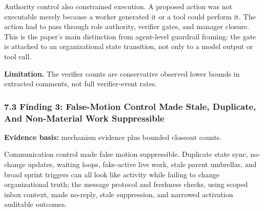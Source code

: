 \documentclass[
]{article}
\begin{document}
Authority control also constrained execution. A proposed action was not executable merely because a worker generated it or a tool could perform it. The action had to pass through role authority, verifier gates, and manager closure. This is the paper's main distinction from agent-level guardrail framing: the gate is attached to an organizational state transition, not only to a model output or tool call.

\textbf{Limitation.} The verifier counts are conservative observed lower bounds in extracted comments, not full verifier-event rates.

\subsubsection{7.3 Finding 3: False-Motion Control Made Stale, Duplicate, And Non-Material Work Suppressible}\label{finding-3-false-motion-control-made-stale-duplicate-and-non-material-work-suppressible}

\textbf{Evidence basis:} mechanism evidence plus bounded closeout counts.

Communication control made false motion suppressible. Duplicate state sync, no-change updates, waiting loops, fake-active live work, stale parent umbrellas, and broad sprint triggers can all look like activity while failing to change organizational truth; the message protocol and freshness checks, using scoped inbox context, made no-reply, stale suppression, and narrowed activation auditable outcomes.
\end{document}
